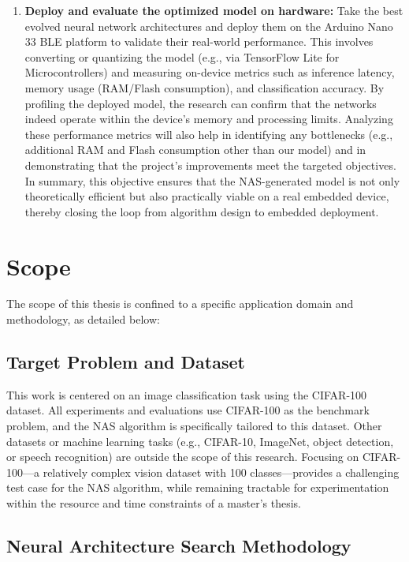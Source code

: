 \begin{enumerate}
    \item \textbf{Deploy and evaluate the optimized model on hardware:} Take the best evolved neural network architectures and deploy them on the Arduino Nano 33 BLE platform to validate their real-world performance. This involves converting or quantizing the model (e.g., via TensorFlow Lite for Microcontrollers) and measuring on-device metrics such as inference latency, memory usage (RAM/Flash consumption), and classification accuracy. By profiling the deployed model, the research can confirm that the networks indeed operate within the device’s memory and processing limits. Analyzing these performance metrics will also help in identifying any bottlenecks (e.g., additional RAM and Flash consumption other than our model) and in demonstrating that the project’s improvements meet the targeted objectives. In summary, this objective ensures that the NAS-generated model is not only theoretically efficient but also practically viable on a real embedded device, thereby closing the loop from algorithm design to embedded deployment.
\end{enumerate}


\section{Scope}

The scope of this thesis is confined to a specific application domain and methodology, as detailed below:

\subsection{Target Problem and Dataset}

This work is centered on an image classification task using the CIFAR-100 dataset. All experiments and evaluations use CIFAR-100 as the benchmark problem, and the NAS algorithm is specifically tailored to this dataset. Other datasets or machine learning tasks (e.g., CIFAR-10, ImageNet, object detection, or speech recognition) are outside the scope of this research. Focusing on CIFAR-100—a relatively complex vision dataset with 100 classes—provides a challenging test case for the NAS algorithm, while remaining tractable for experimentation within the resource and time constraints of a master’s thesis.

\subsection{Neural Architecture Search Methodology}

